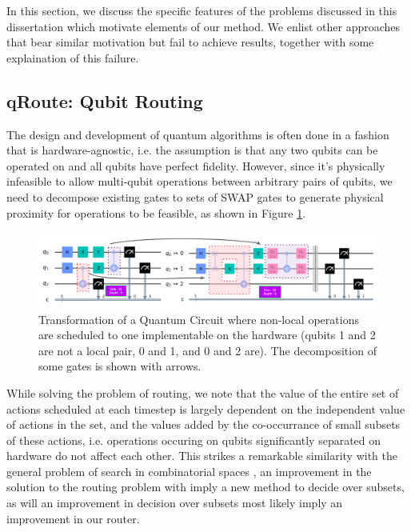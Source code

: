 In this section, we discuss the specific features of the problems discussed in this dissertation which motivate elements of our method. We enlist other approaches that bear similar motivation but fail to achieve results, together with some explaination of this failure.

\subsection{qRoute: Qubit Routing}

The design and development of quantum algorithms is often done in a fashion that is hardware-agnostic, i.e. the assumption is that any two qubits can be operated on and all qubits have perfect fidelity. However, since it's physically infeasible to allow multi-qubit operations between arbitrary pairs of qubits, we need to decompose existing gates to sets of SWAP gates to generate physical proximity for operations to be feasible, as shown in Figure \ref{fig:intro-qubit-routing-example}. 

\begin{figure}[ht]
    \centering
    \includegraphics[width=\linewidth]{figures/intro/routing-transform.png}
    \caption{Transformation of a Quantum Circuit where non-local operations are scheduled to one implementable on the hardware (qubits 1 and 2 are not a local pair, 0 and 1, and 0 and 2 are). The decomposition of some gates is shown with arrows.}
    \label{fig:intro-qubit-routing-example}
\end{figure}

While solving the problem of routing, we note that the value of the entire set of actions scheduled at each timestep is largely dependent on the independent value of actions in the set, and the values added by the co-occurrance of small subsets of these actions, i.e. operations occuring on qubits significantly separated on hardware do not affect each other. This strikes a remarkable similarity with the general problem of search in combinatorial spaces \cite{qroute_dqn1}, an improvement in the solution to the routing problem with imply a new method to decide over subsets, as will an improvement in decision over subsets most likely imply an improvement in our router.

